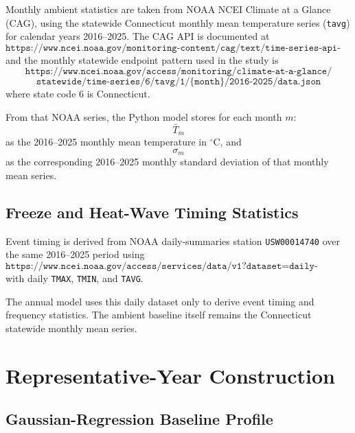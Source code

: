 \documentclass{article}
\begin{document}
Monthly ambient statistics are taken from NOAA NCEI Climate at a Glance
(CAG), using the statewide Connecticut monthly mean temperature series
(\texttt{tavg}) for calendar years 2016--2025. The CAG API is documented at
\begin{equation}
\texttt{https://www.ncei.noaa.gov/monitoring-content/cag/text/time-series-api-doc.html}
\end{equation}
and the monthly statewide endpoint pattern used in the study is
\begin{equation}
\texttt{https://www.ncei.noaa.gov/access/monitoring/climate-at-a-glance/}
\end{equation}
\begin{equation}
\texttt{statewide/time-series/6/tavg/1/\{month\}/2016-2025/data.json}
\end{equation}
where state code $6$ is Connecticut.

From that NOAA series, the Python model stores for each month $m$:
\begin{equation}
\bar{T}_m
\end{equation}
as the 2016--2025 monthly mean temperature in $^\circ$C, and
\begin{equation}
\sigma_m
\end{equation}
as the corresponding 2016--2025 monthly standard deviation of that monthly
mean series.

\subsection{Freeze and Heat-Wave Timing Statistics}

Event timing is derived from NOAA daily-summaries station
\texttt{USW00014740} over the same 2016--2025 period using
\begin{equation}
\texttt{https://www.ncei.noaa.gov/access/services/data/v1?dataset=daily-summaries}
\end{equation}
with daily \texttt{TMAX}, \texttt{TMIN}, and \texttt{TAVG}.

The annual model uses this daily dataset only to derive event timing and
frequency statistics. The ambient baseline itself remains the Connecticut
statewide monthly mean series.

\section{Representative-Year Construction}

\subsection{Gaussian-Regression Baseline Profile}
\end{document}
